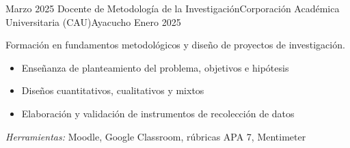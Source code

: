 \experience
{Marzo 2025} {Docente de Metodología de la Investigación}{Corporación Académica Universitaria (CAU)}{Ayacucho}
{Enero 2025} {
	Formación en fundamentos metodológicos y diseño de proyectos de investigación.
	\begin{itemize}
		\item Enseñanza de planteamiento del problema, objetivos e hipótesis
		\item Diseños cuantitativos, cualitativos y mixtos
		\item Elaboración y validación de instrumentos de recolección de datos
	\end{itemize}
}
{\footnotesize{\emph{Herramientas:} Moodle, Google Classroom, rúbricas APA 7, Mentimeter}}
